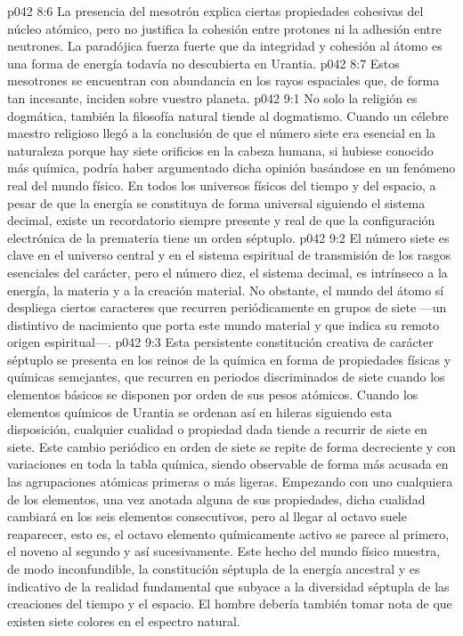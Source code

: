 \vs p042 8:6 La presencia del mesotrón explica ciertas propiedades cohesivas del núcleo atómico, pero no justifica la cohesión entre protones ni la adhesión entre neutrones. La paradójica fuerza fuerte que da integridad y cohesión al átomo es una forma de energía todavía no descubierta en Urantia.
\vs p042 8:7 Estos mesotrones se encuentran con abundancia en los rayos espaciales que, de forma tan incesante, inciden sobre vuestro planeta.
\vs p042 9:1 No solo la religión es dogmática, también la filosofía natural tiende al dogmatismo. Cuando un célebre maestro religioso llegó a la conclusión de que el número siete era esencial en la naturaleza porque hay siete orificios en la cabeza humana, si hubiese conocido más química, podría haber argumentado dicha opinión basándose en un fenómeno real del mundo físico. En todos los universos físicos del tiempo y del espacio, a pesar de que la energía se constituya de forma universal siguiendo el sistema decimal, existe un recordatorio siempre presente y real de que la configuración electrónica de la premateria tiene un orden séptuplo.
\vs p042 9:2 El número siete es clave en el universo central y en el sistema espiritual de transmisión de los rasgos esenciales del carácter, pero el número diez, el sistema decimal, es intrínseco a la energía, la materia y a la creación material. No obstante, el mundo del átomo sí despliega ciertos caracteres que recurren periódicamente en grupos de siete ---un distintivo de nacimiento que porta este mundo material y que indica su remoto origen espiritual---.
\vs p042 9:3 Esta persistente constitución creativa de carácter séptuplo se presenta en los reinos de la química en forma de propiedades físicas y químicas semejantes, que recurren en periodos discriminados de siete cuando los elementos básicos se disponen por orden de sus pesos atómicos. Cuando los elementos químicos de Urantia se ordenan así en hileras siguiendo esta disposición, cualquier cualidad o propiedad dada tiende a recurrir de siete en siete. Este cambio periódico en orden de siete se repite de forma decreciente y con variaciones en toda la tabla química, siendo observable de forma más acusada en las agrupaciones atómicas primeras o más ligeras. Empezando con uno cualquiera de los elementos, una vez anotada alguna de sus propiedades, dicha cualidad cambiará en los seis elementos consecutivos, pero al llegar al octavo suele reaparecer, esto es, el octavo elemento químicamente activo se parece al primero, el noveno al segundo y así sucesivamente. Este hecho del mundo físico muestra, de modo inconfundible, la constitución séptupla de la energía ancestral y es indicativo de la realidad fundamental que subyace a la diversidad séptupla de las creaciones del tiempo y el espacio. El hombre debería también tomar nota de que existen siete colores en el espectro natural.
